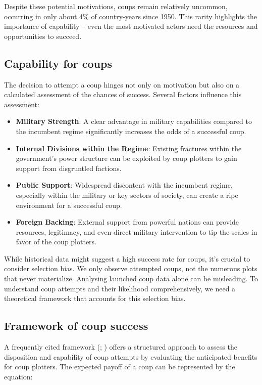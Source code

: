 \documentclass[
  12pt,
]{report}
\begin{document}
Despite these potential motivations, coups remain relatively uncommon,
occurring in only about 4\% of country-years since 1950. This rarity
highlights the importance of capability -- even the most motivated
actors need the resources and opportunities to succeed.

\subsection{Capability for coups}\label{capability-for-coups}

The decision to attempt a coup hinges not only on motivation but also on
a calculated assessment of the chances of success. Several factors
influence this assessment:

\begin{itemize}
\item
  \textbf{Military Strength}: A clear advantage in military capabilities
  compared to the incumbent regime significantly increases the odds of a
  successful coup.
\item
  \textbf{Internal Divisions within the Regime}: Existing fractures
  within the government's power structure can be exploited by coup
  plotters to gain support from disgruntled factions.
\item
  \textbf{Public Support}: Widespread discontent with the incumbent
  regime, especially within the military or key sectors of society, can
  create a ripe environment for a successful coup.
\item
  \textbf{Foreign Backing}: External support from powerful nations can
  provide resources, legitimacy, and even direct military intervention
  to tip the scales in favor of the coup plotters.
\end{itemize}

While historical data might suggest a high success rate for coups, it's
crucial to consider selection bias. We only observe attempted coups, not
the numerous plots that never materialize. Analysing launched coup data
alone can be misleading. To understand coup attempts and their
likelihood comprehensively, we need a theoretical framework that
accounts for this selection bias.

\subsection{Framework of coup success}\label{framework-of-coup-success}

A frequently cited framework (; )
offers a structured approach to assess the disposition and capability of
coup attempts by evaluating the anticipated benefits for coup plotters.
The expected payoff of a coup can be represented by the equation:
\end{document}
